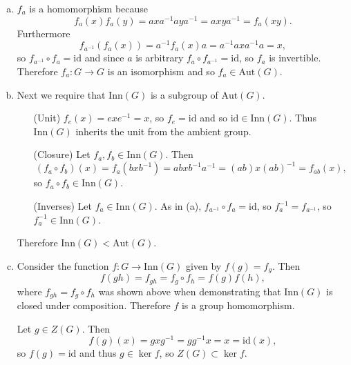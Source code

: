 \documentclass{article}
\begin{document}
\begin{Answer}
\begin{enumerate}[(a)]
  \item{$f_a$ is a homomorphism because
        $$
        f_a(x) f_a(y) = a x a^{-1} a y a^{-1}
                      = a x y a^{-1}
                      = f_a(xy).
        $$
        Furthermore
        $$
        f_{a^{-1}}(f_a(x)) = a^{-1} f_a(x) a
                         = a^{-1} a x a^{-1} a
                         = x,
        $$
        so $f_{a^{-1}} \circ f_a = \mathrm{id}$ and since $a$ is
        arbitrary $f_a \circ f_{a^{-1}} = \mathrm{id}$, so $f_a$ is
        invertible. Therefore $f_a : G \to G$ is an isomorphism and
        so $f_a \in \mathrm{Aut}(G)$.
        }
      \item{Next we require that $\mathrm{Inn}(G)$ is a subgroup
            of $\mathrm{Aut}(G)$.
        \begin{itemize}
          \item[(Unit)]{
            $f_e(x) = e x e^{-1} = x$, so
            $f_e = \mathrm{id}$ and so $\mathrm{id} \in
            \mathrm{Inn}(G)$. Thus $\mathrm{Inn}(G)$ inherits the unit
            from the ambient group.
            }
          \item[(Closure)]{
              Let $f_a, f_b \in \mathrm{Inn}(G)$. Then
              $$
              (f_a \circ f_b)(x) = f_a( b x b^{-1})
                                 = a b x b^{-1} a^{-1}
                                 = (ab) x (ab)^{-1}
                                 = f_{ab}(x),
              $$
              so $f_a \circ f_b \in \mathrm{Inn}(G)$.
            }
          \item[(Inverses)]{
              Let $f_a \in \mathrm{Inn}(G)$.
              As in (a), $f_{a^{-1}} \circ f_a = \mathrm{id}$, so
              $f_a^{-1} = f_{a^{-1}}$, so $f_a^{-1} \in \mathrm{Inn}(G)$.
            }
        \end{itemize}
        Therefore $\mathrm{Inn}(G) < \mathrm{Aut}(G)$.
      }
      \item{Consider the function
            $f: G \to \mathrm{Inn}(G)$ given by $f(g) = f_g$. Then
            $$
            f(gh) = f_{gh} = f_g \circ f_h = f(g)f(h),
            $$
            where $f_{gh} = f_g \circ f_h$ was shown above when
            demonstrating that $\mathrm{Inn}(G)$ is closed under composition.
            Therefore $f$ is a group homomorphism.

            Let $g \in Z(G)$. Then
            $$
            f(g)(x) = g x g^{-1} = g g^{-1} x = x = \mathrm{id}(x),
            $$
            so $f(g) = \mathrm{id}$ and thus $g \in \ker f$, so $Z(G)
            \subset \ker f$.

}
\end{enumerate}
\end{Answer}
\end{document}
